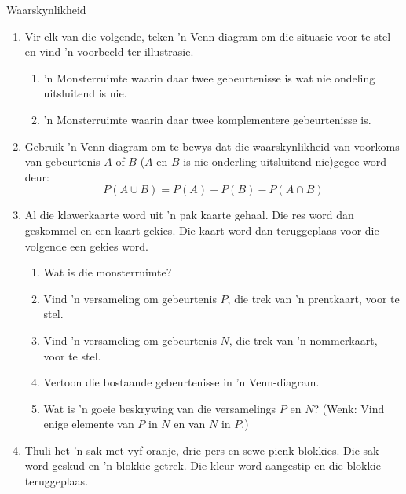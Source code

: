 \begin{eoexercises}{Waarskynlikheid}
\begin{enumerate}[itemsep=5pt, label=\textbf{\arabic*}]
    \begin{enumerate}
    \item As ek 'n lekker willekeurig kies, wat is die waarskynlikheid dit die volgende sal wees:
      \begin{enumerate}
      \item Pers of blou
      \item Swart
      \item Pers
      \end{enumerate}
    \item As daar $70$ lekkers in die houer is, hoeveel perses is daar?
    \item $\frac{1}{4}$ van die pers lekkers in b) het strepe en die res nie, hoeveel pers lekkers het strepe?
    \end{enumerate}
  \item Vir elk van die volgende, teken 'n Venn-diagram om die situasie voor te stel en vind 'n voorbeeld ter illustrasie.
    \begin{enumerate}
    \item 'n Monsterruimte waarin daar twee gebeurtenisse is wat nie ondeling uitsluitend is nie.
    \item 'n Monsterruimte waarin daar twee komplementere gebeurtenisse is.
    \end{enumerate}
  \item Gebruik 'n Venn-diagram om te bewys dat die waarskynlikheid van voorkoms van gebeurtenis  $A$ of $B$ ($A$ en $B$ is nie onderling uitsluitend nie)gegee word deur:
    \[P(A \cup B) = P(A) + P(B) - P(A \cap B)\]
  \item Al die klawerkaarte word uit 'n pak kaarte gehaal. Die res word dan geskommel en een kaart gekies. Die kaart word dan teruggeplaas voor die volgende een gekies word.
    \begin{enumerate}
    \item Wat is die monsterruimte?
    \item Vind 'n versameling om gebeurtenis $P$, die trek van 'n prentkaart, voor te stel.
    \item Vind 'n versameling om gebeurtenis $N$, die trek van 'n nommerkaart, voor te stel.
    \item Vertoon die bostaande gebeurtenisse in 'n Venn-diagram.
    \item Wat is 'n goeie beskrywing van die versamelings $P$ en $N$?
      (Wenk: Vind enige elemente van $P$ in $N$ en van $N$ in $P$.)
    \end{enumerate}
  \item Thuli het 'n sak met vyf oranje, drie pers en sewe pienk blokkies. Die sak word geskud en 'n blokkie getrek. Die kleur word aangestip en die blokkie teruggeplaas.

\end{enumerate}
\end{eoexercises}
